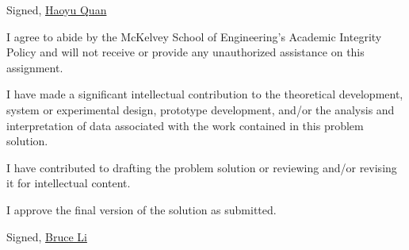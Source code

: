\documentclass[11pt,letterpaper]{article}
\begin{document}
\vspace{10pt}

\noindent Signed, \underline{Haoyu Quan}

\begin{todolist}[label={\checkmark}]
    \item I agree to abide by the McKelvey School of Engineering's Academic Integrity Policy and will not receive or provide any unauthorized assistance on this assignment.
    \item I have made a significant intellectual contribution to the theoretical development, system or experimental design, prototype development, and/or the analysis and interpretation of data associated with the work contained in this problem solution.
    \item I have contributed to drafting the problem solution or reviewing and/or revising it for intellectual content.
    \item I approve the final version of the solution as submitted.
\end{todolist}

\vspace{10pt}

\noindent Signed, \underline{Bruce Li}
\end{document}
